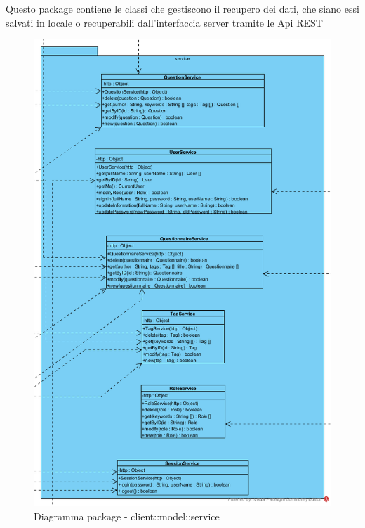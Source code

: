 Questo package contiene le classi che gestiscono il recupero dei dati, che siano essi salvati in locale o recuperabili dall'interfaccia server tramite le Api REST\begin{center}
		\begin{figure}[H]
			\centering \includegraphics[scale=4, max width=\textwidth, max height=\myheight]{../img/diagrammiClassi/client/model/service.png}
			\caption{Diagramma package - client::model::service}
		\end{figure}
	\end{center}\hypertarget{client::model::service::SessionService}{}
